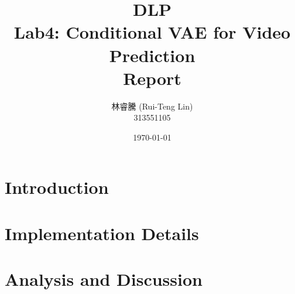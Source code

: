 \documentclass[11pt]{article}
\title{DLP\\ Lab4: Conditional VAE for Video Prediction\\Report}
\author{林睿騰 (Rui-Teng Lin)\\
313551105}
\date{\today}
\begin{document}
\begin{CJK*}{UTF8}{bsmi}  %
    \maketitle



    \newpage

    \tableofcontents

    \newpage

    \section{Introduction}
    

    \section{Implementation Details}
    

    \section{Analysis and Discussion}
    

    \begin{appendices}
        
    \end{appendices}


\end{CJK*}  %
\end{document}
